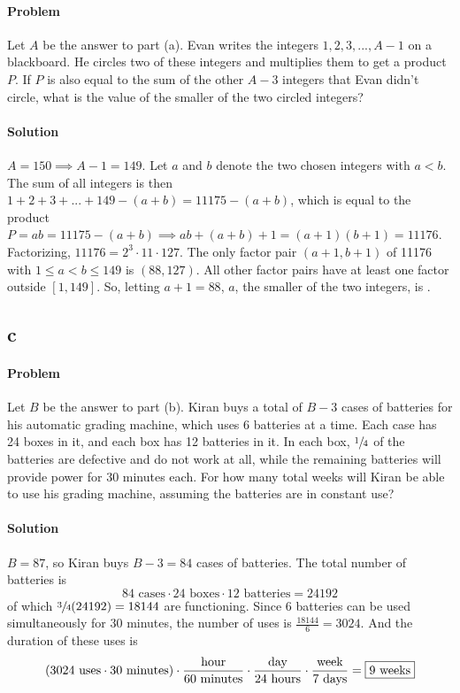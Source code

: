 \documentclass[10pt]{article}
\theoremstyle{plain}
\theoremstyle{definition}
\theoremstyle{remark}
\begin{document}
\paragraph{Problem} Let \(A\) be the answer to part (a). Evan writes the integers \(1,2,3,...,A-1\) on a blackboard. He circles two of these integers and multiplies them to get a product \(P\). If \(P\) is also equal to the sum of the other \(A-3\) integers that Evan didn't circle, what is the value of the smaller of the two circled integers? 

\paragraph{Solution} \(A=150\implies A-1=149\). Let \(a\) and \(b\) denote the two chosen integers with \(a<b\). The sum of all integers is then \(1+2+3+...+149-(a+b)=11175-(a+b)\), which is equal to the product \(P=ab=11175-(a+b)\implies ab+(a+b)+1=(a+1)(b+1)=11176\). Factorizing, \(11176=2^3\cdot11\cdot127\). The only factor pair \((a+1,b+1)\) of 11176 with \(1\leqslant a<b\leqslant149\) is \((88,127)\). All other factor pairs have at least one factor outside \([1,149]\). So, letting \(a+1=88\), \(a\), the smaller of the two integers, is .   

\subsection{c}

\paragraph{Problem} Let \(B\) be the answer to part (b). Kiran buys a total of \(B-3\) cases of batteries for his automatic grading machine, which uses 6 batteries at a time. Each case has 24 boxes in it, and each box has 12 batteries in it. In each box, \(\sfrac{1}{4}\) of the batteries are defective and do not work at all, while the remaining batteries will provide power for 30 minutes each. For how many total weeks will Kiran be able to use his grading machine, assuming the batteries are in constant use?

\paragraph{Solution} \(B=87\), so Kiran buys \(B-3=84\) cases of batteries. The total number of batteries is \[84\text{ cases}\cdot24\text{ boxes}\cdot12\text{ batteries}=24192\] of which \(\sfrac{3}{4}(24192)=18144\) are functioning. Since \(6\) batteries can be used simultaneously for 30 minutes, the number of uses is \(\frac{18144}{6}=3024\). And the duration of these uses is \[(3024\text{ uses}\cdot30\text{ minutes})\cdot\frac{\text{hour}}{\text{60 minutes}}\cdot\frac{\text{day}}{\text{24 hours}}\cdot\frac{\text{week}}{\text{7 days}}=\fbox{\(9\text{ weeks}\)}
\]
\end{document}
